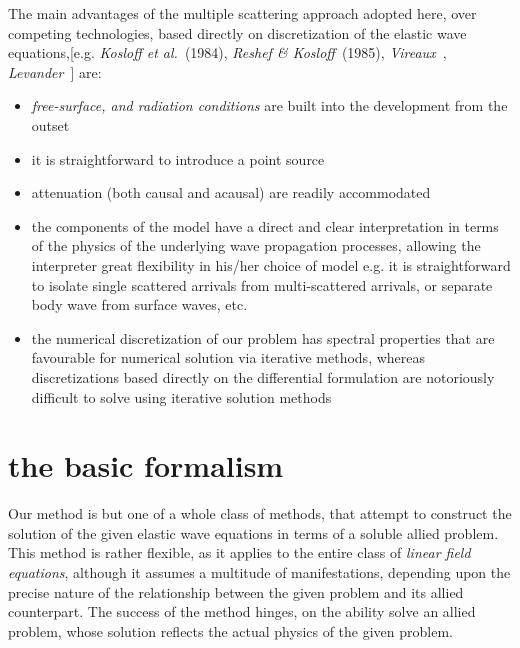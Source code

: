 The main advantages of the multiple scattering approach adopted here, over competing 
technologies, based directly on discretization of the elastic wave
equations,[e.g. {\em Kosloff et al.\/}~(1984), {\em Reshef \& 
Kosloff\/}~(1985), {\em Vireaux}~, {\em 
Levander}~] are:
\begin{itemize}
\item {\em free-surface, and radiation conditions\/} are 
built into the development from the outset

\item it is straightforward to introduce a point source

\item attenuation (both causal and acausal) are readily accommodated

\item the components of the model have a direct and clear interpretation
in terms of the  physics of the underlying wave propagation processes, 
allowing the interpreter great flexibility in his/her choice of model
e.g. it is straightforward to 
isolate single scattered arrivals from multi-scattered arrivals, or separate
body wave from surface waves, etc.

\item the numerical discretization of our problem has spectral properties that are 
favourable for numerical solution via iterative methods, whereas 
discretizations based directly on the differential formulation are 
notoriously difficult to solve using iterative solution methods
\end{itemize}
 


\section{the basic formalism}
Our method is but one of a whole class of methods, that attempt to construct the solution of the 
given elastic wave equations in terms of a soluble allied problem. This method is 
rather flexible, as it applies to the entire class of {\em linear 
field equations\/}, although it assumes a multitude of manifestations, 
depending upon the precise nature of the relationship between the given 
problem and its allied counterpart. The success of the method hinges,
 on the ability solve an allied problem, whose solution 
reflects the actual physics of the given problem.

